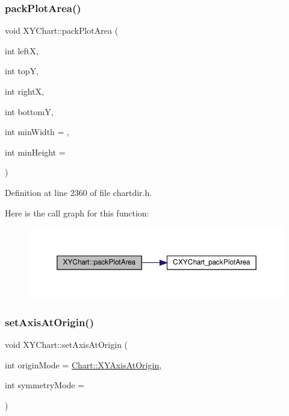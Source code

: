 \subsubsection{\texorpdfstring{pack\+Plot\+Area()}{packPlotArea()}}
{\footnotesize\ttfamily void X\+Y\+Chart\+::pack\+Plot\+Area (\begin{DoxyParamCaption}\item[{int}]{leftX,  }\item[{int}]{topY,  }\item[{int}]{rightX,  }\item[{int}]{bottomY,  }\item[{int}]{min\+Width = {},  }\item[{int}]{min\+Height = {} }\end{DoxyParamCaption})\hspace{0.3cm}{\ttfamily [inline]}}



Definition at line 2360 of file chartdir.\+h.

Here is the call graph for this function\+:
\nopagebreak
\begin{figure}[H]
\begin{center}
\leavevmode
\includegraphics[width=350pt]{class_x_y_chart_a2d607d6dc0522d1f8547c72e007c538d_cgraph}
\end{center}
\end{figure}
\mbox{\label{class_x_y_chart_af108637af88e17464fbd2e675c03964f}} 
\subsubsection{\texorpdfstring{set\+Axis\+At\+Origin()}{setAxisAtOrigin()}}
{\footnotesize\ttfamily void X\+Y\+Chart\+::set\+Axis\+At\+Origin (\begin{DoxyParamCaption}\item[{int}]{origin\+Mode = {\ttfamily \hyperlink{namespace_chart_a4c12835958ae0919e9c54011055fa7b4a39ca2a3eabb9c560fdc20cbb2559bdc8}{Chart\+::\+X\+Y\+Axis\+At\+Origin}},  }\item[{int}]{symmetry\+Mode = {} }\end{DoxyParamCaption})\hspace{0.3cm}{\ttfamily [inline]}}



